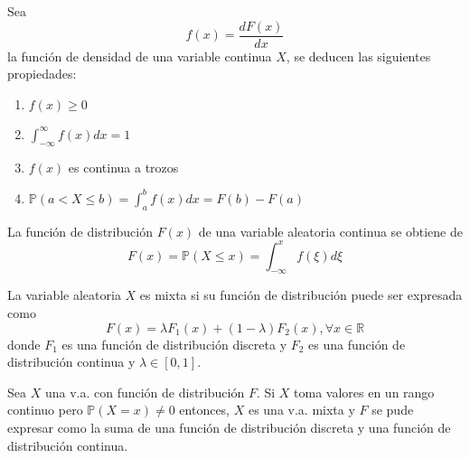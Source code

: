 \begin{prop}
Sea \[ f(x) = \frac{d F(x)}{dx}\] la función de densidad de una variable continua $X$, se deducen las siguientes propiedades:

\begin{enumerate}[label=(\roman*)]
    \item $f(x)\geq 0$
    \item $\int_{-\infty}^\infty f(x)dx = 1$
    \item $f(x)$ es continua a trozos
    \item $\mathbb{P}(a<X\leq b) = \int_{a}^b f(x)dx = F(b) - F(a)$
\end{enumerate}
La función de distribución $F(x)$ de una variable aleatoria continua se obtiene de \[ F(x) = \mathbb{P}(X\leq x) = \int_{-\infty}^x f(\xi)d\xi\]
\end{prop}

\begin{defn}
La variable aleatoria $X$ es mixta si su función de distribución puede ser expresada como \[ F(x) = \lambda F_1(x) + (1-\lambda)F_2(x), \forall x\in\mathbb{R} \] donde $F_1$ es una función de distribución discreta y $F_2$ es una función de distribución continua y $\lambda\in[0,1]$.
\end{defn}

\begin{obs}
Sea $X$ una v.a. con función de distribución $F$. Si $X$ toma valores en un rango continuo pero $\mathbb{P}(X=x)\neq 0$ entonces, $X$ es una v.a. mixta y $F$ se pude expresar como la suma de una función de distribución discreta y una función de distribución continua.
\end{obs}

\begin{ejr}

\end{ejr}

\begin{ejr}

\end{ejr}

\begin{ejr}

\end{ejr}

\begin{ejr}

\end{ejr}

